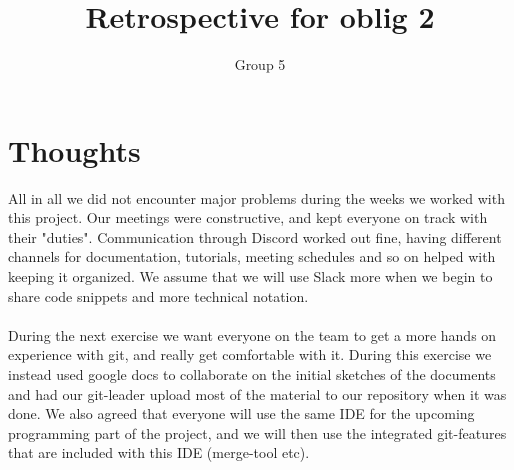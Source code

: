 \documentclass{article}
\title{Retrospective for oblig 2}
\author{Group 5}
\date{}
\begin{document}
    \maketitle
    
    \section{Thoughts}
    \noindent
    All in all we did not encounter major problems during the weeks we worked with this project. Our meetings were constructive, and kept everyone on track with their "duties". Communication through Discord worked out fine, having different channels for documentation, tutorials, meeting schedules and so on helped with keeping it organized. We assume that we will use Slack more when we begin to share code snippets and more technical notation. \\ \\
    During the next exercise we want everyone on the team to get a more hands on experience with git, and really get comfortable with it. During this exercise we instead used google docs to collaborate on the initial sketches of the documents and had our git-leader upload most of the material to our repository when it was done. We also agreed that everyone will use the same IDE for the upcoming programming part of the project, and we will then use the integrated git-features that are included with this IDE (merge-tool etc).
\end{document}
